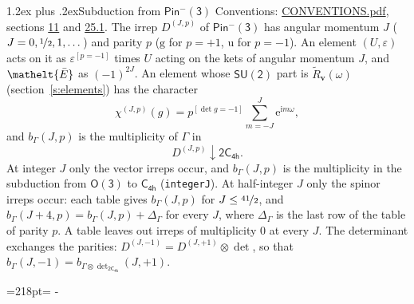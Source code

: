 \documentclass[10pt,a4paper]{article}
\makeatletter
\renewcommand\section{\@startsection{section}{1}{\z@}{-3ex plus -1ex minus -.2ex}%
  {1.2ex plus .2ex}{\normalfont\large\sffamily\bfseries\color{parttitle}}}
\newcommand{\needspace}[1]{\par\penalty-100\begingroup\dimen0=#1\relax\dimen2=\pagegoal
  \advance\dimen2-\pagetotal\ifdim\dimen0>\dimen2\relax\ifdim\dimen2>0pt\vfil\break\fi\fi
  \endgroup}
\numberwithin{equation}{section}
\newcommand{\eltfont}[1]{{\let\sigma\eltsigma\mathelt{#1}}}
\newcommand{\grp}[1]{\mathsf{#1}}
\newcommand{\elt}[1]{\eltfont{#1}}
\newcommand{\ptag}[1]{\mathrm{#1}}
\newcommand{\iverson}[1]{[#1]}
\newcommand{\restr}[2]{#1\!\downarrow#2}
\newcommand{\vv}{\mathbf{v}}
\newcommand{\iunit}{\mathrm{i}}
\newcommand{\expe}{\mathrm{e}}
\newcommand{\irrJp}[2]{D^{(#1,#2)}}
\newcommand{\irrprod}{\otimes}
\newcommand{\barred}[1]{\bar{#1}}
\newcommand{\lift}[1]{\tilde{#1}}
\makeatother
\begin{document}
\section{Subduction from \texorpdfstring{$\grp{Pin^{-}(3)}$}{Pin(3)}}\label{s:subduction_parent}
Conventions: \href{../../CONVENTIONS.pdf}{CONVENTIONS.pdf}, sections \href{../../../rotation/CONVENTIONS.pdf\#conv.11}{11} and \href{../../CONVENTIONS.pdf\#conv.25.1}{25.1}.
\leavevmode\label{n:index.J}\label{n:index.parity}\label{n:irrep.o3}The irrep $\irrJp{J}{p}$ of \href{Pinminus3.pdf}{$\grp{Pin^{-}(3)}$} has angular momentum $J$ ($J = 0, \nicefrac{1}{2}, 1, \dots$) and parity $p$ ($\ptag{g}$ for $p = +1$, $\ptag{u}$ for $p = -1$). An element $(U, \varepsilon)$ acts on it as $\varepsilon^{[p = -1]}$ times $U$ acting on the kets of angular momentum $J$, and $\elt{\barred{E}}$ as $(-1)^{2J}$. \label{n:function.character.parent}\label{n:function.multiplicity}An element whose $\grp{SU(2)}$ part is $\lift{R}_{\vv}(\omega)$ (section~\ref{s:elements}) has the character
\begin{equation}\label{e:chi}\chi^{(J,p)}(g) = p^{\iverson{\det g = -1}}\sum_{m=-J}^{J} \expe^{\iunit m\omega},\end{equation}
and $b_\Gamma(J, p)$ is the multiplicity of $\Gamma$ in
\begin{equation}\label{e:parent}\restr{\irrJp{J}{p}}{\grp{2C_{4h}}}.\end{equation}
At integer $J$ only the vector irreps occur, and $b_\Gamma(J, p)$ is the multiplicity in the subduction from $\grp{O(3)}$ to \href{../../../rotation/data/pdf/C4h.pdf}{$\grp{C_{4h}}$} (\texttt{integerJ}). \label{n:index.increment}At half-integer $J$ only the spinor irreps occur: each table gives $b_\Gamma(J, p)$ for $J \le \nicefrac{41}{2}$, and $b_\Gamma(J + 4, p) = b_\Gamma(J, p) + \Delta_\Gamma$ for every $J$, where $\Delta_\Gamma$ is the last row of the table of parity $p$. A table leaves out irreps of multiplicity 0 at every $J$.
\leavevmode\label{n:operator.determinant.character}The determinant exchanges the parities: $\irrJp{J}{-1} = \irrJp{J}{+1} \irrprod \det$, so that $b_\Gamma(J, -1) = b_{\Gamma \irrprod \det_{\grp{2C_{4h}}}}(J, +1)$.
\needspace{218pt}
\end{document}

